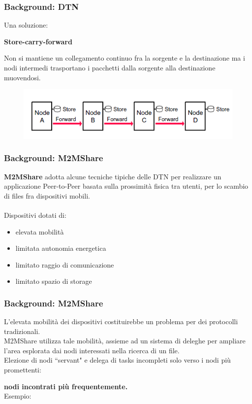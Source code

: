 \documentclass{beamer}
\begin{document}
\begin{frame}
\frametitle{Background: DTN}
Una soluzione:
\ \\
\begin{center}
\textbf{Store-carry-forward}\\
\end{center}

Non si mantiene un collegamento continuo fra la sorgente e la destinazione ma i nodi intermedi trasportano i pacchetti dalla sorgente alla destinazione muovendosi.

\begin{center}
\begin{figure}[ht]
\includegraphics[scale=0.4]{store-and-forward.png}
\end{figure}
\end{center}
\end{frame}




\begin{frame}
\frametitle{Background: M2MShare}
\label{M2MShare}
\textbf{M2MShare} adotta alcune tecniche tipiche delle DTN per realizzare un applicazione Peer-to-Peer basata sulla prossimità fisica tra utenti, per lo scambio di files fra dispositivi mobili.
\ \\
\ \\
\pause 
Dispositivi dotati di:
\begin{itemize}
\item elevata mobilità
\item limitata autonomia energetica
\item limitato raggio di comunicazione
\item limitato spazio di storage
\end{itemize}
\end{frame}

\begin{frame}
\frametitle{Background: M2MShare}
L'elevata mobilità dei dispositivi costituirebbe un problema per dei protocolli tradizionali.\\
M2MShare utilizza tale mobilità, assieme ad un sistema di deleghe per ampliare l'area esplorata dai nodi interessati nella ricerca di un file.
\ \\

\pause
Elezione di nodi ``servant" e delega di tasks incompleti solo verso i nodi più promettenti: \\
\begin{center}
\textbf{nodi incontrati più frequentemente.}
\ \\
Esempio: 
\end{center}
\end{frame}
\end{document}
